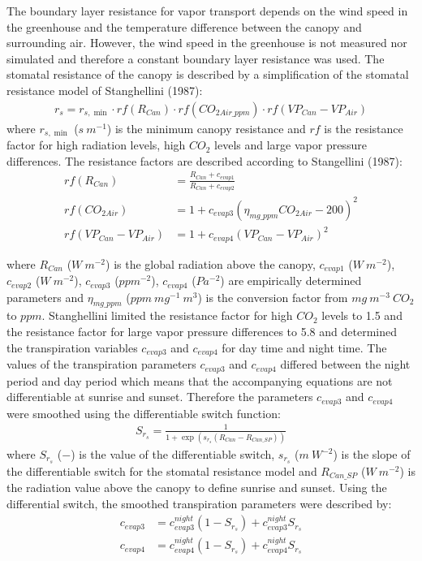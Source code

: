 \documentclass[a4paper]{article}
\numberwithin{equation}{section}
\begin{document}
The boundary layer resistance for vapor transport depends on the wind speed in the greenhouse and the temperature difference between the canopy and surrounding air\cite{stanghellini1987transpiration}.
However, the wind speed in the greenhouse is not measured nor simulated and therefore a constant boundary layer resistance was used.
The stomatal resistance of the canopy is described by a simplification of the stomatal resistance model of Stanghellini (1987):
\begin{align}
  r_s = r_{s,\min} \cdot rf(R_{Can}) \cdot rf(CO_{2Air\_ppm}) \cdot rf(VP_{Can} - VP_{Air})
\end{align}
where \(r_{s,\min}\) (\(s\ m^{-1}\)) is the minimum canopy resistance and \(rf\) is the resistance factor for high radiation levels, high \(CO_2\) levels and large vapor pressure differences.
The resistance factors are described according to Stangellini (1987):
\begin{equation}
  \begin{split}
    rf(R_{Can}) & = \frac{R_{Can} + c_{evap1}}{R_{Can} + c_{evap2}} \\
    rf(CO_{2Air}) & = 1 + {c_{evap3} (\eta_{mg\_ppm} CO_{2Air} - 200)}^2 \\
    rf(VP_{Can} - VP_{Air}) & = 1 + {c_{evap4} (VP_{Can} - VP_{Air})}^2
  \end{split}
\end{equation}

where \(R_{Can}\) (\(W\ m^{-2}\)) is the global radiation above the canopy, \(c_{evap1}\) (\(W\ m^{-2}\)), \(c_{evap2}\) (\(W\ m^{-2}\)), \(c_{evap3}\) (\(ppm^{-2}\)), \(c_{evap4}\) (\(Pa^{-2}\)) are empirically determined parameters and \(\eta_{mg\_ppm}\) (\(ppm\ mg^{-1}\ m^3\)) is the conversion factor from \(mg\ m^{-3}\ CO_2\) to \(ppm\).
Stanghellini limited the resistance factor for high \(CO_2\) levels to 1.5 and the resistance factor for large vapor pressure differences to 5.8 and determined the transpiration variables \(c_{evap3}\) and \(c_{evap4}\) for day time and night time.
The values of the transpiration parameters \(c_{evap3}\) and \(c_{evap4}\) differed between the night period and day period which means that the accompanying equations are not differentiable at sunrise and sunset. Therefore the parameters \(c_{evap3}\) and \(c_{evap4}\) were smoothed using the differentiable switch function:
\begin{align}
  S_{r_s} = \frac{1}{1 + \exp \left(s_{r_s} (R_{Can} - R_{Can\_SP})\right)}
\end{align}
where \(S_{r_s}\) (\(-\)) is the value of the differentiable switch, \(s_{r_s}\) (\(m\ W^{-2}\)) is the slope of the differentiable switch for the stomatal resistance model and \(R_{Can\_SP}\) (\(W\ m^{-2}\)) is the radiation value above the canopy to define sunrise and sunset.
Using the differential switch, the smoothed transpiration parameters were described by:
\begin{align}
  c_{evap3} & = c_{evap3}^{night} (1 - S_{r_s}) + c_{evap3}^{night} S_{r_s} \\
  c_{evap4} & = c_{evap4}^{night} (1 - S_{r_s}) + c_{evap4}^{night} S_{r_s}
\end{align}
\end{document}
